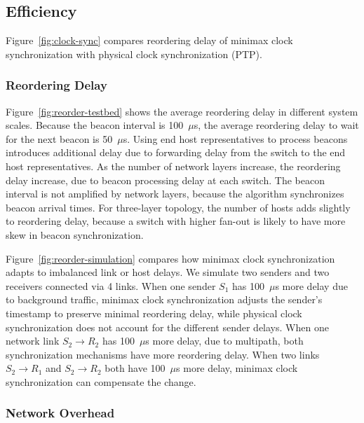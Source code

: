 \subsection{Efficiency}

Figure~\ref{fig:clock-sync} compares reordering delay of minimax clock synchronization with physical clock synchronization (PTP).

\subsubsection{Reordering Delay}
\label{sec:eval-delay}

Figure~\ref{fig:reorder-testbed} shows the average reordering delay in different system scales.
Because the beacon interval is 100~$\mu$s, the average reordering delay to wait for the next beacon is 50~$\mu$s.
Using end host representatives to process beacons introduces additional delay due to forwarding delay from the switch to the end host representatives.
As the number of network layers increase, the reordering delay increase, due to beacon processing delay at each switch.
The beacon interval is not amplified by network layers, because the algorithm synchronizes beacon arrival times.
For three-layer topology, the number of hosts adds slightly to reordering delay, because a switch with higher fan-out is likely to have more skew in beacon synchronization.

Figure~\ref{fig:reorder-simulation} compares how minimax clock synchronization adapts to imbalanced link or host delays.
We simulate two senders and two receivers connected via 4 links.
When one sender $S_1$ has 100~$\mu$s more delay due to background traffic, minimax clock synchronization adjusts the sender's timestamp to preserve minimal reordering delay, while physical clock synchronization does not account for the different sender delays.
When one network link $S_2 \rightarrow R_2$ has 100~$\mu$s more delay, due to multipath, both synchronization mechanisms have more reordering delay.
When two links $S_2 \rightarrow R_1$ and $S_2 \rightarrow R_2$ both have 100~$\mu$s more delay, minimax clock synchronization can compensate the change.





\subsubsection{Network Overhead}
\label{sec:eval-overhead}


